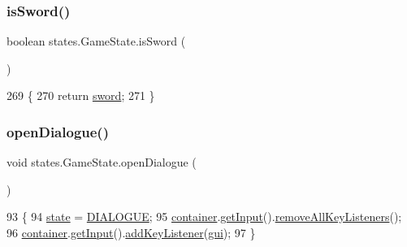 \subsubsection{\texorpdfstring{is\+Sword()}{isSword()}}
{\footnotesize\ttfamily boolean states.\+Game\+State.\+is\+Sword (\begin{DoxyParamCaption}{ }\end{DoxyParamCaption})\hspace{0.3cm}{\ttfamily [inline]}}


\begin{DoxyCode}
269                              \{
270         \textcolor{keywordflow}{return} \mbox{\hyperlink{classstates_1_1_game_state_af984dc048942d10169fb7127bcc30273}{sword}};
271     \}
\end{DoxyCode}
\mbox{\label{classstates_1_1_game_state_a4d77661bfb3bf9d51cb10807fb300215}} 
\subsubsection{\texorpdfstring{open\+Dialogue()}{openDialogue()}}
{\footnotesize\ttfamily void states.\+Game\+State.\+open\+Dialogue (\begin{DoxyParamCaption}{ }\end{DoxyParamCaption})\hspace{0.3cm}{\ttfamily [inline]}}


\begin{DoxyCode}
93                                \{
94         \mbox{\hyperlink{classstates_1_1_game_state_a5e07b1776e13d009e1a8c6a1e8140d04}{state}} = \mbox{\hyperlink{classstates_1_1_game_state_ae5ee1ef1d4462e5a6667b05addc61fb6}{DIALOGUE}};
95         \mbox{\hyperlink{classstates_1_1_game_state_a88b0df4b57ada742c53e4e1ee3b25827}{container}}.\mbox{\hyperlink{classorg_1_1newdawn_1_1slick_1_1_game_container_a6042fd06c54872f9f791bd33beffec88}{getInput}}().\mbox{\hyperlink{classorg_1_1newdawn_1_1slick_1_1_input_ae9aa4789e13f1528ae603939684a4237}{removeAllKeyListeners}}();
96         \mbox{\hyperlink{classstates_1_1_game_state_a88b0df4b57ada742c53e4e1ee3b25827}{container}}.\mbox{\hyperlink{classorg_1_1newdawn_1_1slick_1_1_game_container_a6042fd06c54872f9f791bd33beffec88}{getInput}}().\mbox{\hyperlink{classorg_1_1newdawn_1_1slick_1_1_input_af5ad91bb375e8834e1914f441794561b}{addKeyListener}}(\mbox{\hyperlink{namespacegui}{gui}});
97     \}
\end{DoxyCode}
\mbox{\label{classstates_1_1_game_state_a487c240070c56cae7ca69c4066ccefa8}} 
